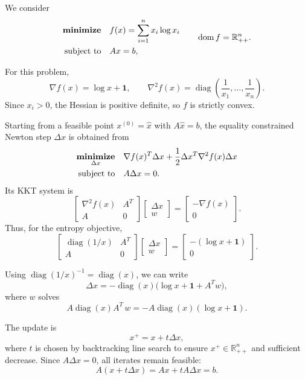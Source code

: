 \documentclass[11pt,letter,notitlepage]{article}
\DeclareMathOperator*{\minimize}{\bf minimize}
\theoremstyle{definition}
\begin{document}
\begin{solution}
We consider
\[
\begin{aligned}
\minimize \quad & f(x)=\sum_{i=1}^n x_i\log x_i\\
\text{subject to}\quad & Ax=b,
\end{aligned}
\qquad \operatorname{dom}f=\mathbb R_{++}^n.
\]

For this problem,
\[
\nabla f(x)=\log x+\mathbf 1,
\qquad
\nabla^2 f(x)=\operatorname{diag}\!\left(\frac1{x_1},\dots,\frac1{x_n}\right).
\]
Since \(x_i>0\), the Hessian is positive definite, so \(f\) is strictly convex.

Starting from a feasible point \(x^{(0)}=\hat x\) with \(A\hat x=b\), the equality constrained Newton step
\(\Delta x\) is obtained from
\[
\begin{aligned}
\minimize_{\Delta x}\quad
& \nabla f(x)^T\Delta x+\frac12 \Delta x^T\nabla^2 f(x)\Delta x\\
\text{subject to}\quad
& A\Delta x=0.
\end{aligned}
\]
Its KKT system is
\[
\begin{bmatrix}
\nabla^2 f(x) & A^T\\
A & 0
\end{bmatrix}
\begin{bmatrix}
\Delta x\\
w
\end{bmatrix}
=
\begin{bmatrix}
-\nabla f(x)\\
0
\end{bmatrix}.
\]
Thus, for the entropy objective,
\[
\begin{bmatrix}
\operatorname{diag}(1/x) & A^T\\
A & 0
\end{bmatrix}
\begin{bmatrix}
\Delta x\\
w
\end{bmatrix}
=
\begin{bmatrix}
-(\log x+\mathbf 1)\\
0
\end{bmatrix}.
\]

Using \(\operatorname{diag}(1/x)^{-1}=\operatorname{diag}(x)\), we can write
\[
\Delta x=-\operatorname{diag}(x)\bigl(\log x+\mathbf 1+A^T w\bigr),
\]
where \(w\) solves
\[
A\operatorname{diag}(x)A^T\,w
=
-A\operatorname{diag}(x)(\log x+\mathbf 1).
\]

The update is
\[
x^+=x+t\Delta x,
\]
where \(t\) is chosen by backtracking line search to ensure \(x^+\in\mathbb R_{++}^n\) and sufficient decrease. Since \(A\Delta x=0\), all iterates remain feasible:
\[
A(x+t\Delta x)=Ax+tA\Delta x=b.
\]


\end{solution}
\end{document}
